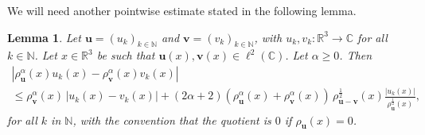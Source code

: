 \documentclass[12pt,a4paper]{amsart}
\newtheorem{lemma}[theorem]{Lemma}
\numberwithin{equation}{section}
\newcommand{\ulu}{\boldsymbol{u}}
\newcommand{\ulv}{\boldsymbol{v}}
\begin{document}
	We will need another pointwise estimate stated in the following lemma. 
	
	\begin{lemma} \label{lem:power_pointwise_estimate}	Let $ \ulu = (u_k)_{k\in\mathbb{N}} $ and $ \ulv = (v_k)_{k\in\mathbb{N}} $, with $u_k,v_k:\mathbb{R}^3\to\mathbb{C}$ for all $k\in\mathbb{N}$. Let $x\in\mathbb{R}^3$ be such that $\ulu(x),\ulv(x)\in\ell^2(\mathbb{C})$. Let $\alpha\ge0$. Then
		\begin{multline}
			| \rho_{\ulu }^\alpha (x) u_k(x) - \rho_{\ulv }^\alpha (x) v_k(x) | \\
			\leq \rho_{\ulv }^\alpha (x) \, | u_k(x) - v_k(x) | + (2\alpha+2) ( \rho_{\ulu }^\alpha (x) + \rho_{\ulv }^\alpha (x) )\, \rho_{\ulu -\ulv }^{\frac{1}{2}} (x) \frac{|u_k(x)|}{\rho_{\ulu }^{\frac{1}{2}}(x)} ,
		\end{multline}
		for all $k$ in $\mathbb{N}$, with the convention that the quotient is $0$ if $\rho_{\ulu }(x)=0$.
	\end{lemma}
\end{document}
